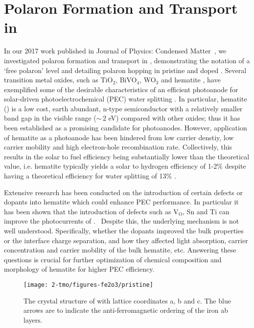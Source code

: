 \def\vo{\text{V}_\text{O}}

\section{Polaron Formation and Transport in }

In our 2017 work published in Journal of Physics: Condensed Matter~\cite{smart2017effect}, we investigated polaron formation and transport in , demonstrating the notation of a `free polaron' level and detailing polaron hopping in pristine and doped .
Several transition metal oxides, such as TiO$_2$, BiVO$_4$, WO$_3$ and hematite , have exemplified some of the desirable characteristics of an efficient photoanode for solar-driven photoelectrochemical (PEC) water splitting \cite{alexander2008metal,sivula2011solar}. In particular, hematite () is a low cost, earth abundant, n-type semiconductor with a relatively smaller band gap in the visible range ($\sim\,$2 eV) compared with other oxides; thus it has been established as a promising candidate for photoanodes. However, application of hematite as a photoanode has been hindered from low carrier denstiy, low carrier mobility and high electron-hole recombination rate. Collectively, this results in the solar to fuel efficiency being substantially lower than the theoretical value, i.e. hematite typically yields a solar to hydrogen efficiency of 1-2\% despite having a theoretical efficiency for water splitting of 13\% \cite{glasscock2007enhancement}.

Extensive research has been conducted on the introduction of certain defects or dopants into hematite which could enhance PEC performance. In particular it has been shown that the introduction of defects such as $\vo$, Sn and Ti can improve the photocurrents of .~\cite{forster2015oxygen,ling2011sn,wang2011facile} Despite this, the underlying mechanism is not well understood. Specifically, whether the dopants improved the bulk properties or the interface charge separation, and how they affected light absorption, carrier concentration and carrier mobility of the bulk hematite, etc. Answering these questions is crucial for further optimization of chemical composition and morphology of hematite for higher PEC efficiency.

\begin{figure}[t!]
\begin{center}
\texttt{[image: 2-tmo/figures-fe2o3/pristine]}
\caption{The crystal structure of  with lattice coordinates a, b and c. The blue arrows are to indicate the anti-ferromagnetic ordering of the iron ab layers.} \label{fe2o3:fig:pristine}
\end{center}
\end{figure}

